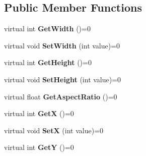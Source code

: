 \subsection*{Public Member Functions}
\begin{DoxyCompactItemize}
\item 
\hypertarget{struct_jade_1_1_system_1_1_i_window_a6e039061e47c6d533e7aae7e3335aeff}{}virtual int {\bfseries Get\+Width} ()=0\label{struct_jade_1_1_system_1_1_i_window_a6e039061e47c6d533e7aae7e3335aeff}

\item 
\hypertarget{struct_jade_1_1_system_1_1_i_window_ae5294c899b398a8efe912c06f5eda0ec}{}virtual void {\bfseries Set\+Width} (int value)=0\label{struct_jade_1_1_system_1_1_i_window_ae5294c899b398a8efe912c06f5eda0ec}

\item 
\hypertarget{struct_jade_1_1_system_1_1_i_window_acec7abf3182935e654dd9e8271c6e2b5}{}virtual int {\bfseries Get\+Height} ()=0\label{struct_jade_1_1_system_1_1_i_window_acec7abf3182935e654dd9e8271c6e2b5}

\item 
\hypertarget{struct_jade_1_1_system_1_1_i_window_acd96618872a2a2b8f195c2cc5b19ac9e}{}virtual void {\bfseries Set\+Height} (int value)=0\label{struct_jade_1_1_system_1_1_i_window_acd96618872a2a2b8f195c2cc5b19ac9e}

\item 
\hypertarget{struct_jade_1_1_system_1_1_i_window_a6def5292c72237c393577207c5a8f907}{}virtual float {\bfseries Get\+Aspect\+Ratio} ()=0\label{struct_jade_1_1_system_1_1_i_window_a6def5292c72237c393577207c5a8f907}

\item 
\hypertarget{struct_jade_1_1_system_1_1_i_window_a1bad223d4ed74c9014a06ddf4bf9b583}{}virtual int {\bfseries Get\+X} ()=0\label{struct_jade_1_1_system_1_1_i_window_a1bad223d4ed74c9014a06ddf4bf9b583}

\item 
\hypertarget{struct_jade_1_1_system_1_1_i_window_a84c1ffac1f65157d9d94bf94679ed21d}{}virtual void {\bfseries Set\+X} (int value)=0\label{struct_jade_1_1_system_1_1_i_window_a84c1ffac1f65157d9d94bf94679ed21d}

\item 
\hypertarget{struct_jade_1_1_system_1_1_i_window_ab09f4572cfcb28360160824af3cb7d5e}{}virtual int {\bfseries Get\+Y} ()=0\label{struct_jade_1_1_system_1_1_i_window_ab09f4572cfcb28360160824af3cb7d5e}


\end{DoxyCompactItemize}
